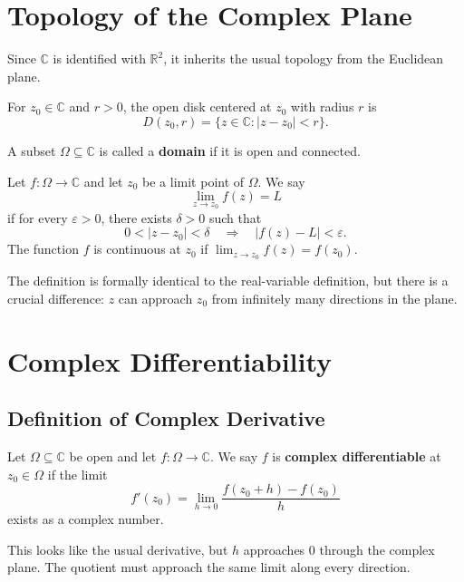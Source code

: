 \section{Topology of the Complex Plane}

Since $\mathbb{C}$ is identified with $\mathbb{R}^2$, it inherits the usual topology from the Euclidean plane.

\begin{definition}
For $z_0\in\mathbb{C}$ and $r>0$, the open disk centered at $z_0$ with radius $r$ is
\[
    D(z_0,r)=\{z\in\mathbb{C}:|z-z_0|<r\}.
\]
\end{definition}

\begin{definition}[Domain]
A subset $\Omega\subseteq\mathbb{C}$ is called a \textbf{domain} if it is open and connected.
\end{definition}

\begin{definition}
Let $f:\Omega\to\mathbb{C}$ and let $z_0$ be a limit point of $\Omega$. We say
\[
    \lim_{z\to z_0}f(z)=L
\]
if for every $\varepsilon>0$, there exists $\delta>0$ such that
\[
    0<|z-z_0|<\delta
    \quad\Longrightarrow\quad
    |f(z)-L|<\varepsilon.
\]
The function $f$ is continuous at $z_0$ if $\lim_{z\to z_0}f(z)=f(z_0)$.
\end{definition}

The definition is formally identical to the real-variable definition, but there is a crucial difference: $z$ can approach $z_0$ from infinitely many directions in the plane.

\section{Complex Differentiability}

\subsection{Definition of Complex Derivative}

\begin{definition}
Let $\Omega\subseteq\mathbb{C}$ be open and let $f:\Omega\to\mathbb{C}$. We say $f$ is \textbf{complex differentiable} at $z_0\in\Omega$ if the limit
\[
    f'(z_0)=\lim_{h\to 0}\frac{f(z_0+h)-f(z_0)}{h}
\]
exists as a complex number.
\end{definition}

This looks like the usual derivative, but $h$ approaches $0$ through the complex plane. The quotient must approach the same limit along every direction.

